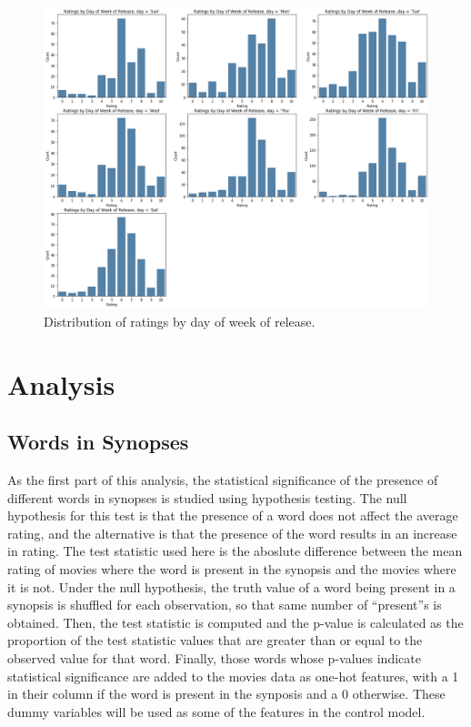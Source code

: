 \documentclass[12pt, oneside]{article}   	%
\begin{document}
\begin{itemize}
\begin{figure}%
\includegraphics[width=\textwidth]{ratings_dow}
\caption{\label{fig:ratings_dow}Distribution of ratings by day of week of release.}
\end{figure}

\end{itemize}

\section{Analysis}

\subsection{Words in Synopses}
\label{section:words_in_synopses}

As the first part of this analysis, the statistical significance of the presence of different words in synopses is studied using hypothesis testing. The null hypothesis for this test is that the presence of a word does not affect the average rating, and the alternative is that the presence of the word results in an increase in rating. The test statistic used here is the aboslute difference between the mean rating of movies where the word is present in the synopsis and the movies where it is not. Under the null hypothesis, the truth value of a word being present in a synopsis is shuffled for each observation, so that same number of ``present''s is obtained. Then, the test statistic is computed and the p-value is calculated as the proportion of the test statistic values that are greater than or equal to the observed value for that word. Finally, those words whose p-values indicate statistical significance are added to the movies data as one-hot features, with a 1 in their column if the word is present in the synposis and a 0 otherwise. These dummy variables will be used as some of the features in the control model.
\end{document}
